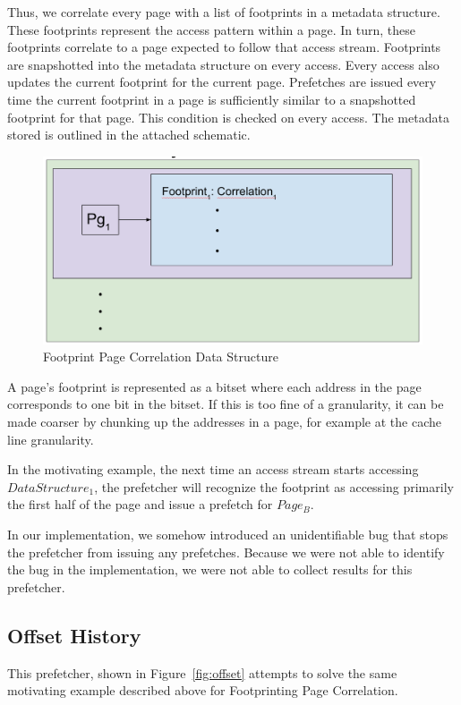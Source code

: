 \documentclass[conference]{IEEEtran}
\begin{document}
        Thus, we correlate every page with a list of footprints in a metadata structure. These footprints represent the access pattern within a page. In turn, these footprints correlate to a page expected to follow that access stream. Footprints are snapshotted into the metadata structure on every access. Every access also updates the current footprint for the current page. Prefetches are issued every time the current footprint in a page is sufficiently similar to a snapshotted footprint for that page. This condition is checked on every access. The metadata stored is outlined in the attached schematic.
        
        \begin{figure}[h]
            \centering
                \includegraphics[width=.5\textwidth]{footprint_metadata.png}
            \caption{Footprint Page Correlation Data Structure}
        \end{figure}
        
        A page's footprint is represented as a bitset where each address in the page corresponds to one bit in the bitset. If this is too fine of a granularity, it can be made coarser by chunking up the addresses in a page, for example at the cache line granularity. 
        
        In the motivating example, the next time an access stream starts accessing $DataStructure_1$, the prefetcher will recognize the footprint as accessing primarily the first half of the page and issue a prefetch for $Page_B$.
        
        In our implementation, we somehow introduced an unidentifiable bug that stops the prefetcher from issuing any prefetches. Because we were not able to identify the bug in the implementation, we were not able to collect results for this prefetcher. 

    \subsection{Offset History}
        This prefetcher, shown in Figure~\ref{fig:offset} attempts to solve the same motivating example described above for Footprinting Page Correlation. 
\end{document}

